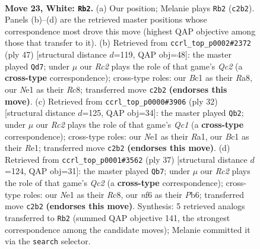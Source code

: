 \documentclass[11pt]{article}
\begin{document}
\clearpage

\begin{figure}[p]\centering
\begin{subfigure}{0.46\textwidth}\centering
\resizebox{\linewidth}{!}{%
\newchessgame
\chessboard[
  setfen={2rq3r/4bp1k/2n2n2/p6p/1p1p2p1/1P1P2P1/P1RQ1P1P/RNB1N1K1 w - - 2 23},
  showmover=false,
  pgfstyle=straightmove, color=movearrow, markmove={c2-b2}
]}
\caption{}
\end{subfigure}\hfill
\begin{subfigure}{0.46\textwidth}\centering
\resizebox{\linewidth}{!}{%
\newchessgame
\chessboard[
  setfen={r1rbb1k1/ppq2pp1/4p3/1PnpP3/3N1B2/P1N3P1/4QPK1/1R1R4 b - - 2 24},
  showmover=false,
  pgfstyle=straightmove, color=movearrow, markmove={c7-d7}
]}
\caption{}
\end{subfigure}
\\[4pt]
\begin{subfigure}{0.46\textwidth}\centering
\resizebox{\linewidth}{!}{%
\newchessgame
\chessboard[
  setfen={2rqr1k1/pp3p2/5np1/2ppn2p/8/1P1PP2P/P2NBPP1/R1Q1R1K1 w - - 0 17},
  showmover=false,
  pgfstyle=straightmove, color=movearrow, markmove={c1-b2}
]}
\caption{}
\end{subfigure}\hfill
\begin{subfigure}{0.46\textwidth}\centering
\resizebox{\linewidth}{!}{%
\newchessgame
\chessboard[
  setfen={r1r3k1/2q1bppp/pp1ppnn1/8/2P1P3/1PN2NP1/P2BQP1P/2RR2K1 b - - 2 19},
  showmover=false,
  pgfstyle=straightmove, color=movearrow, markmove={c7-b7}
]}
\caption{}
\end{subfigure}
\caption{\textbf{Move 23, White: \texttt{Rb2}.} (a) Our position; Melanie plays \texttt{Rb2} (\texttt{c2b2}). Panels (b)--(d) are the retrieved master positions whose correspondence most drove this move (highest QAP objective among those that transfer to it). (b) Retrieved from \texttt{ccrl\_top\_p0002\#2372} (ply 47) [structural distance $d$=119, QAP obj=48]: the master played \texttt{Qd7}; under $\mu$ our \emph{Rc2} plays the role of that game's \emph{Qc2} (a \textbf{cross-type} correspondence); cross-type roles: our \emph{B}c1 as their \emph{R}a8, our \emph{N}e1 as their \emph{R}c8; transferred move \texttt{c2b2} \textbf{(endorses this move)}. (c) Retrieved from \texttt{ccrl\_top\_p0000\#3906} (ply 32) [structural distance $d$=125, QAP obj=34]: the master played \texttt{Qb2}; under $\mu$ our \emph{Rc2} plays the role of that game's \emph{Qc1} (a \textbf{cross-type} correspondence); cross-type roles: our \emph{N}e1 as their \emph{R}a1, our \emph{B}c1 as their \emph{R}e1; transferred move \texttt{c2b2} \textbf{(endorses this move)}. (d) Retrieved from \texttt{ccrl\_top\_p0001\#3562} (ply 37) [structural distance $d$=124, QAP obj=31]: the master played \texttt{Qb7}; under $\mu$ our \emph{Rc2} plays the role of that game's \emph{Qc2} (a \textbf{cross-type} correspondence); cross-type roles: our \emph{N}e1 as their \emph{R}c8, our \emph{n}f6 as their \emph{P}b6; transferred move \texttt{c2b2} \textbf{(endorses this move)}. Synthesis: 5 retrieved analogs transferred to \texttt{Rb2} (summed QAP objective 141, the strongest correspondence among the candidate moves); Melanie committed it via the \texttt{search} selector.}
\label{fig:thought-m44}
\end{figure}
\end{document}
